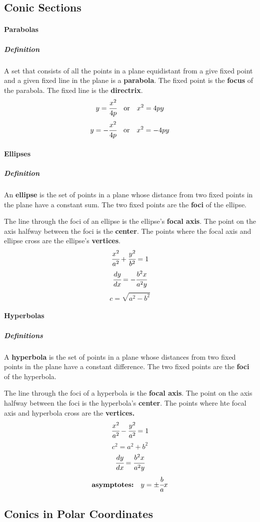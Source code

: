 \documentclass{article}
\begin{document}
        \subsection{Conic Sections}
            \paragraph{Parabolas}
                \subparagraph{Definition} A set that consists of all the points in a plane equidistant from a give fixed point and a given fixed line in the plane is a \textbf{parabola}. The fixed point is the \textbf{focus} of the parabola. The fixed line is the \textbf{directrix}.
            \[y=\cfrac{x^2}{4p}\quad\text{or}\quad x^2=4py\]
            \[y=-\cfrac{x^2}{4p}\quad\text{or}\quad x^2=-4py\]
            \paragraph{Ellipses}
                \subparagraph{Definition} An \textbf{ellipse} is the set of points in a plane whose distance from two fixed points in the plane have a constant sum. The two fixed points are the \textbf{foci} of the ellipse.
                \par The line through the foci of an ellipse is the ellipse's \textbf{focal axis}. The point on the axis halfway between the foci is the \textbf{center}. The points where the focal axis and ellipse cross are the ellipse's \textbf{vertices}.
                \[\cfrac{x^2}{a^2}+\cfrac{y^2}{b^2}=1\]
                \[\cfrac{dy}{dx}=-\cfrac{b^2x}{a^2y}\]
                \[c=\sqrt{a^2-b^2}\]
            \paragraph{Hyperbolas}
                \subparagraph{Definitions} A \textbf{hyperbola} is the set of points in a plane whose distances from two fixed points in the plane have a constant difference. The two fixed points are the \textbf{foci} of the hyperbola.
                \par The line through the foci of a hyperbola is the \textbf{focal axis}. The point on the axis halfway between the foci is the hyperbola's \textbf{center}. The points where hte focal axis and hyperbola cross are the \textbf{vertices.}
                \[\cfrac{x^2}{a^2}-\cfrac{y^2}{a^2}=1\]
                \[c^2=a^2+b^2\]
                \[\cfrac{dy}{dx}=\cfrac{b^2x}{a^2y}\]
                \[\textbf{asymptotes:}\quad y=\pm\cfrac{b}{a}x\]
        \subsection{Conics in Polar Coordinates}
\end{document}
